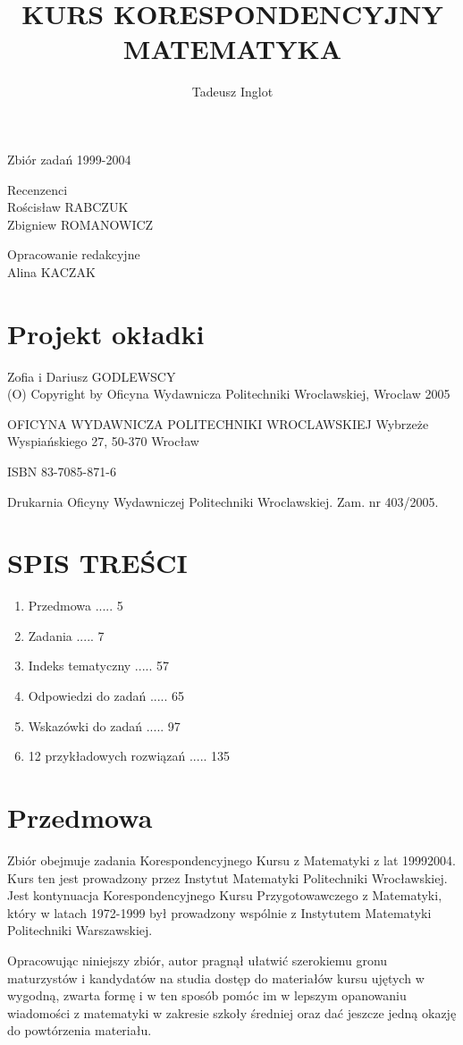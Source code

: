 \documentclass[10pt]{article}
\title{KURS KORESPONDENCYJNY MATEMATYKA }
\author{Tadeusz Inglot}
\date{}
\begin{document}
\maketitle


Zbiór zadań 1999-2004

Recenzenci\\
Rościsław RABCZUK\\
Zbigniew ROMANOWICZ

Opracowanie redakcyjne\\
Alina KACZAK

\section*{Projekt okładki}
Zofia i Dariusz GODLEWSCY\\
(O) Copyright by Oficyna Wydawnicza Politechniki Wroclawskiej, Wroclaw 2005

OFICYNA WYDAWNICZA POLITECHNIKI WROCLAWSKIEJ Wybrzeże Wyspiańskiego 27, 50-370 Wrocław

ISBN 83-7085-871-6

Drukarnia Oficyny Wydawniczej Politechniki Wroclawskiej. Zam. nr 403/2005.

\section*{SPIS TREŚCI}
\begin{enumerate}
  \item Przedmowa ..... 5
  \item Zadania ..... 7
  \item Indeks tematyczny ..... 57
  \item Odpowiedzi do zadań ..... 65
  \item Wskazówki do zadań ..... 97
  \item 12 przykładowych rozwiązań ..... 135
\end{enumerate}

\section*{Przedmowa}
Zbiór obejmuje zadania Korespondencyjnego Kursu z Matematyki z lat 19992004. Kurs ten jest prowadzony przez Instytut Matematyki Politechniki Wrocławskiej. Jest kontynuacja Korespondencyjnego Kursu Przygotowawczego z Matematyki, który w latach 1972-1999 był prowadzony wspólnie z Instytutem Matematyki Politechniki Warszawskiej.

Opracowując niniejszy zbiór, autor pragnął ułatwić szerokiemu gronu maturzystów i kandydatów na studia dostęp do materiałów kursu ujętych w wygodną, zwarta formę i w ten sposób pomóc im w lepszym opanowaniu wiadomości z matematyki w zakresie szkoły średniej oraz dać jeszcze jedną okazję do powtórzenia materiału.
\end{document}
